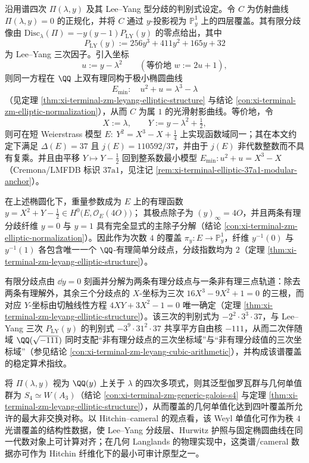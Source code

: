 沿用谱四次 \(\Pi(\lambda,y)\) 及其 Lee--Yang 型分歧的判别式设定。令 \(C\) 为仿射曲线 \(\Pi(\lambda,y)=0\) 的正规化，并将 \(C\) 通过 \(y\)-投影视为 \(\mathbb P^1_y\) 上的四层覆盖。其有限分歧像由
\(
\mathrm{Disc}_{\lambda}(\Pi)=-y(y-1)P_{\mathrm{LY}}(y)
\)
的零点给出，其中
\[
P_{\mathrm{LY}}(y):=256y^3+411y^2+165y+32
\]
为 Lee--Yang 三次因子。引入坐标
\[
u:=y-\lambda^2\qquad(\text{等价地 }w:=2u+1),
\]
则同一方程在 \(\QQ\) 上双有理同构于极小椭圆曲线
\[
E_{\min}:\quad u^2+u=\lambda^3-\lambda
\]
（见定理 \ref{thm:xi-terminal-zm-leyang-elliptic-structure} 与结论 \ref{con:xi-terminal-zm-elliptic-normalization}），从而 \(C\) 为属 \(1\) 的光滑射影曲线。等价地，令
\[
X:=\lambda,\qquad Y:=y-\lambda^2+\tfrac12,
\]
则可在短 Weierstrass 模型
\(
E:\ Y^2=X^3-X+\tfrac14
\)
上实现函数域同一；其在本文约定下满足 \(\Delta(E)=37\) 且 \(j(E)=110592/37\)，并由于 \(j(E)\) 非代数整数而不具有复乘。并且由平移 \(Y\mapsto Y-\tfrac12\) 回到整系数最小模型 \(E_{\min}:u^2+u=X^3-X\)（Cremona/LMFDB 标识 \(37\mathrm a1\)，见注记 \ref{rem:xi-terminal-elliptic-37a1-modular-anchor}）。
\par
在上述椭圆化下，重量参数成为 \(E\) 上的有理函数
\(
y=X^2+Y-\tfrac12\in H^{0}\!\bigl(E,\mathcal O_{E}(4O)\bigr)
\)；
其极点除子为 \((y)_\infty=4O\)，并且两条有理分歧纤维 \(y=0\) 与 \(y=1\) 具有完全显式的主除子分解（结论 \ref{con:xi-terminal-zm-elliptic-normalization}）。因此作为次数 \(4\) 的覆盖 \(\pi_y:E\to\mathbb P^1_y\)，纤维 \(y^{-1}(0)\) 与 \(y^{-1}(1)\) 各包含唯一一个 \(\QQ\)-有理简单分歧点，分歧指数均为 \(2\)（定理 \ref{thm:xi-terminal-zm-leyang-elliptic-structure}）。
\par
有限分歧点由 \(\dd y=0\) 刻画并分解为两条有理分歧点与一条非有理三点轨道：除去两条有理解外，其余三个分歧点的 \(X\)-坐标为三次
\(
16X^3-9X^2+1=0
\)
的三根，而对应 \(Y\)-坐标由切触线性方程
\(
4XY+3X^2-1=0
\)
唯一确定（定理 \ref{thm:xi-terminal-zm-leyang-elliptic-structure}）。该三次的判别式为 \(-2^{2}\cdot 3^{3}\cdot 37\)，与 Lee--Yang 三次 \(P_{\mathrm{LY}}(y)\) 的判别式 \(-3^{9}\cdot 31^{2}\cdot 37\) 共享平方自由核 \(-111\)，从而二次伴随域 \(\QQ(\sqrt{-111})\) 同时支配“非有理分歧点的三次坐标域”与“非有理分歧值的三次坐标域”（参见结论 \ref{con:xi-terminal-zm-leyang-cubic-arithmetic}），并构成该谱覆盖的稳定算术指纹。
\par
将 \(\Pi(\lambda,y)\) 视为 \(\QQ(y)\) 上关于 \(\lambda\) 的四次多项式，则其泛型伽罗瓦群与几何单值群为 \(S_4\simeq W(A_3)\)（结论 \ref{con:xi-terminal-zm-generic-galois-s4} 与定理 \ref{thm:xi-terminal-zm-leyang-elliptic-structure}），从而覆盖的几何单值化达到四叶覆盖所允许的最大非交换对称。以 Hitchin--cameral 的观点看，该 Weyl 单值化可作为秩 \(4\) 光谱覆盖的结构性数据，使 Lee--Yang 分歧层、Hurwitz 护照与固定椭圆曲线在同一代数对象上可计算对齐；在几何 Langlands 的物理实现中，这类谱/cameral 数据亦可作为 Hitchin 纤维化下的最小可审计原型之一。\cite{KapustinWitten2006GeometricLanglands}
